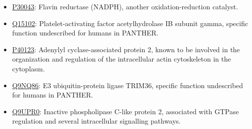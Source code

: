 {\begin{itemize}
\item \href{http://www.pantherdb.org/genes/gene.do?acc=HUMAN\%7CHGNC\%3D1063\%7CUniProtKB\%3DP30043}{P30043}: Flavin reductase (NADPH), another oxidation-reduction catalyst.
\item \href{http://www.pantherdb.org/genes/gene.do?acc=HUMAN\%7CHGNC\%3D8576\%7CUniProtKB\%3DQ15102}{Q15102}: Platelet-activating factor acetylhydrolase IB subunit gamma, specific function undescribed for humans in PANTHER.
\item \href{http://www.pantherdb.org/genes/gene.do?acc=HUMAN\%7CHGNC\%3D20039\%7CUniProtKB\%3DP40123}{P40123}: Adenylyl cyclase-associated protein 2, known to be involved in the organization and regulation of the intracellular actin cytoskeleton in the cytoplasm.
\item \href{http://www.pantherdb.org/genes/gene.do?acc=HUMAN\%7CHGNC\%3D16280\%7CUniProtKB\%3DQ9NQ86}{Q9NQ86}: E3 ubiquitin-protein ligase TRIM36, specific function undescribed for humans in PANTHER.
\item \href{http://www.pantherdb.org/genes/gene.do?acc=HUMAN\%7CHGNC\%3D9064\%7CUniProtKB\%3DQ9UPR0}{Q9UPR0}:  Inactive phospholipase C-like protein 2, associated with GTPase regulation and several intracellular signalling pathways.
\end{itemize}

}

